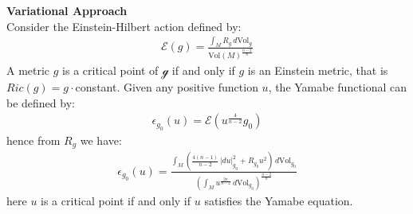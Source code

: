 \documentclass[11pt]{book}
\theoremstyle{break}
\theoremstyle{break}
\begin{document}
\textbf{Variational Approach} \\
Consider the Einstein-Hilbert action defined by:
\begin{align*}
\mathcal{E}(g) = \frac{\int_M R_g\, d\text{Vol}_g}{\text{Vol}(M)^{\frac{n-2}{n}}}
\end{align*}
A metric $g$ is a critical point of $\mathcal{g}$ if and only if $g$ is an Einstein metric, that is $Ric(g) =g\cdot $constant. Given any positive function $u$, the Yamabe functional can be defined by:
\begin{align*}
\epsilon_{g_0}(u) =\mathcal{E}\left(u^{\frac{4}{n-2}}g_0 \right) 
\end{align*}
hence from $R_g$ we have:
\begin{align*}
\epsilon_{g_0}(u) = \frac{\int_M \left(\frac{4(n-1)}{n-2}\, |du|_{g_0}^2 + R_{g_0}u^2 \right)\, d\text{Vol}_{g_0}}{\left( \int_M u^{\frac{2n}{n-2}}\, d\text{Vol}_{g_0}\right)^{\frac{n-2}{n}}}
\end{align*}
here $u$ is a critical point if and only if $u $ satisfies the Yamabe equation.
\end{document}
